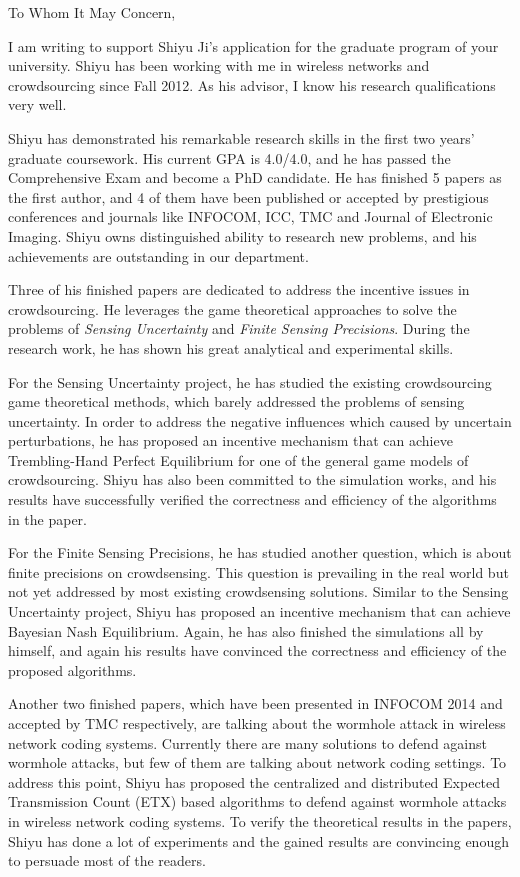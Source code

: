 \documentclass{article}
\begin{document}
\setlength{\parindent}{0cm}
\setlength{\parskip}{\baselineskip}
\pagestyle{empty}

To Whom It May Concern,

I am writing to support Shiyu Ji's application for the graduate program of your university. Shiyu has been working with me in wireless networks and crowdsourcing since Fall 2012. As his advisor, I know his research qualifications very well.

Shiyu has demonstrated his remarkable research skills in the first two years' graduate coursework. His current GPA is 4.0/4.0, and he has passed the Comprehensive Exam and become a PhD candidate. He has finished 5 papers as the first author, and 4 of them have been published or accepted by prestigious conferences and journals like INFOCOM, ICC, TMC and Journal of Electronic Imaging. Shiyu owns distinguished ability to research new problems, and his achievements are outstanding in our department.

Three of his finished papers are dedicated to address the incentive issues in crowdsourcing. He leverages the game theoretical approaches to solve the problems of \emph{Sensing Uncertainty} and \emph{Finite Sensing Precisions}. During the research work, he has shown his great analytical and experimental skills.

For the Sensing Uncertainty project, he has studied the existing crowdsourcing game theoretical methods, which barely addressed the problems of sensing uncertainty. In order to address the negative influences which caused by uncertain perturbations, he has proposed an incentive mechanism that can achieve Trembling-Hand Perfect Equilibrium for one of the general game models of crowdsourcing. Shiyu has also been committed to the simulation works, and his results have successfully verified the correctness and efficiency of the algorithms in the paper.

For the Finite Sensing Precisions, he has studied another question, which is about finite precisions on crowdsensing. This question is prevailing in the real world but not yet addressed by most existing crowdsensing solutions. Similar to the Sensing Uncertainty project, Shiyu has proposed an incentive mechanism that can achieve Bayesian Nash Equilibrium. Again, he has also finished the simulations all by himself, and again his results have convinced the correctness and efficiency of the proposed algorithms.

Another two finished papers, which have been presented in INFOCOM 2014 and accepted by TMC respectively, are talking about the wormhole attack in wireless network coding systems. Currently there are many solutions to defend against wormhole attacks, but few of them are talking about network coding settings. To address this point, Shiyu has proposed the centralized and distributed Expected Transmission Count (ETX) based algorithms to defend against wormhole attacks in wireless network coding systems. To verify the theoretical results in the papers, Shiyu has done a lot of experiments and the gained results are convincing enough to persuade most of the readers.
\end{document}
